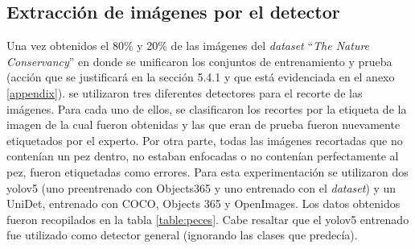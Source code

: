 \subsection{Extracción de imágenes por el detector} 
Una vez obtenidos el 80\% y 20\% de las imágenes del \textit{dataset} ``\textit{The Nature Conservancy}'' en donde se unificaron los conjuntos de entrenamiento y prueba (acción que se justificará en la sección 5.4.1 y que está evidenciada en el anexo \ref{appendix}). se utilizaron tres diferentes detectores para el recorte de las imágenes. Para cada uno de ellos, se clasificaron los recortes por la etiqueta de la imagen de la cual fueron obtenidas y las que eran de prueba fueron nuevamente etiquetados por el experto. Por otra parte, todas las imágenes recortadas que no contenían un pez dentro, no estaban enfocadas o no contenían perfectamente al pez, fueron etiquetadas como errores. Para esta experimentación se utilizaron dos yolov5 (uno preentrenado con Objects365 y uno entrenado con el \textit{dataset}) y un UniDet, entrenado con COCO, Objects 365 y OpenImages. Los datos obtenidos fueron recopilados en la tabla \ref{table:peces}. Cabe resaltar que el yolov5 entrenado fue utilizado como detector general (ignorando las clases que predecía).
\\
